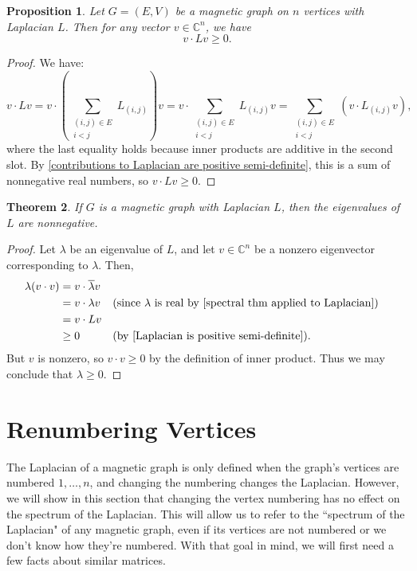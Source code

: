 \documentclass[12pt]{article}
\newtheorem{thm}{Theorem}
\newtheorem{prop}[thm]{Proposition}
\theoremstyle{definition}
\newcommand{\C}{\mathbb C}
\begin{document}
\begin{prop}\label{Laplacian is positive semi-definite}
Let $G=(E, V)$ be a magnetic graph on $n$ vertices with Laplacian $L$. Then for any vector $v \in \C^n$, we have 
$$v \cdot L v \geq 0.$$
\end{prop}
\begin{proof}
We have:
$$v \cdot Lv 
= v \cdot \left(\sum_{\substack{(i, j) \in E \\ i < j}} L_{(i, j)}\right)v
= v \cdot \sum_{\substack{(i, j) \in E \\ i < j}} L_{(i, j)} v = \sum_{\substack{(i, j) \in E \\ i < j}} \left(v \cdot L_{(i, j)} v\right),
$$
where the last equality holds because inner products are additive in the second slot. By \cref{contributions to Laplacian are positive semi-definite}, this is a sum of nonnegative real numbers, so $v \cdot Lv \geq 0$.
\end{proof}

\begin{thm}
If $G$ is a magnetic graph with Laplacian $L$, then the eigenvalues of $L$ are nonnegative.
\end{thm}
\begin{proof}
Let $\lambda$ be an eigenvalue of $L$, and let $v \in \C^n$ be a nonzero eigenvector corresponding to $\lambda$. Then,
\begin{align*}
\lambda (v \cdot v) &= v \cdot \overline\lambda v \\
&= v \cdot \lambda v &&\text{(since $\lambda$ is real by \cref{spectral thm applied to Laplacian})} \\
&= v \cdot L v \\
&\geq 0 &&\text{(by \cref{Laplacian is positive semi-definite})}. \\
\end{align*}
But $v$ is nonzero, so $v \cdot v \geq 0$ by the definition of inner product. Thus we may conclude that $\lambda \geq 0$.
\end{proof}

\section{Renumbering Vertices}

The Laplacian of a magnetic graph is only defined when the graph's vertices are numbered $1, \dots, n$, and changing the numbering changes the Laplacian. However, we will show in this section that changing the vertex numbering has no effect on the spectrum of the Laplacian. This will allow us to refer to the ``spectrum of the Laplacian" of any magnetic graph, even if its vertices are not numbered or we don't know how they're numbered. With that goal in mind, we will first need a few facts about similar matrices.
\end{document}
